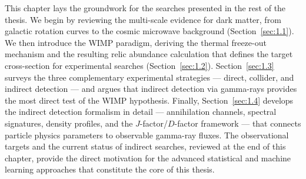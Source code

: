 This chapter lays the groundwork for the searches presented in the rest of the thesis.
We begin by reviewing the multi-scale evidence for dark matter, from galactic rotation curves to the cosmic microwave background (Section~\ref{sec:1.1}).
We then introduce the WIMP paradigm, deriving the thermal freeze-out mechanism and the resulting relic abundance calculation that defines the target cross-section for experimental searches (Section~\ref{sec:1.2}).
Section~\ref{sec:1.3} surveys the three complementary experimental strategies --- direct, collider, and indirect detection --- and argues that indirect detection via gamma-rays provides the most direct test of the WIMP hypothesis.
Finally, Section~\ref{sec:1.4} develops the indirect detection formalism in detail --- annihilation channels, spectral signatures, density profiles, and the $J$-factor/$D$-factor framework --- that connects particle physics parameters to observable gamma-ray fluxes.
The observational targets and the current status of indirect searches, reviewed at the end of this chapter, provide the direct motivation for the advanced statistical and machine learning approaches that constitute the core of this thesis.
